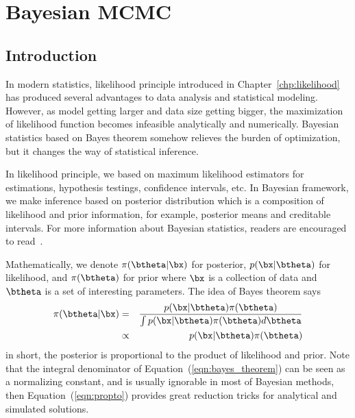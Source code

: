 \chapter{Bayesian MCMC}
\label{chp:mcmc}



\section{Introduction}

In modern statistics, likelihood principle introduced in
Chapter~\ref{chp:likelihood} has produced several advantages to data analysis
and statistical modeling. However, as model getting larger and data size
getting bigger, the maximization of likelihood function becomes infeasible
analytically and numerically. Bayesian statistics based on Bayes theorem
somehow relieves the burden of optimization, but it changes the way of
statistical inference.

In likelihood principle, we based on maximum likelihood
estimators for estimations, hypothesis testings, confidence intervals, etc.
In Bayesian framework, we make inference based on posterior distribution
which is a composition of likelihood and prior information, for example,
posterior means and creditable intervals. For more information about
Bayesian statistics, readers are encouraged to
read~\citet{Berger1993,Gelman2003}.

Mathematically, we denote $\pi(\btheta|\bx)$ for posterior, $p(\bx|\btheta)$
for likelihood, and $\pi(\btheta)$ for prior where $\bx$ is a collection of
data and $\btheta$ is a set of interesting parameters. The idea of Bayes
theorem says
\begin{eqnarray}
\pi(\btheta|\bx)
& = & \frac{p(\bx|\btheta) \pi(\btheta)}{\int p(\bx|\btheta) \pi(\btheta) d\btheta}
      \label{eqn:bayes_theorem} \\
& \propto & p(\bx|\btheta) \pi(\btheta)
            \label{eqn:propto}
\end{eqnarray}
in short, the posterior is proportional to the product of likelihood and prior.
Note that the integral denominator of Equation~(\ref{eqn:bayes_theorem}) can be
seen as a normalizing constant, and is usually ignorable in most of Bayesian
methods, then Equation~(\ref{eqn:propto}) provides great reduction tricks for
analytical and simulated solutions. 

